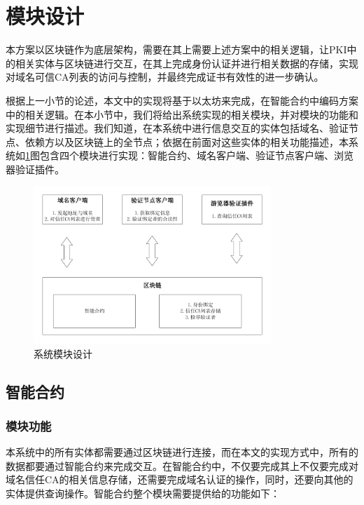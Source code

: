 \section{模块设计}



本方案以区块链作为底层架构，需要在其上需要上述方案中的相关逻辑，让PKI中的相关实体与区块链进行交互，在其上完成身份认证并进行相关数据的存储，实现对域名可信CA列表的访问与控制，并最终完成证书有效性的进一步确认。

根据上一小节的论述，本文中的实现将基于以太坊来完成，在智能合约中编码方案中的相关逻辑。在本小节中，我们将给出系统实现的相关模块，并对模块的功能和实现细节进行描述。我们知道，在本系统中进行信息交互的实体包括域名、验证节点、依赖方以及区块链上的全节点；依据在前面对这些实体的相关功能描述，本系统如\ref{fig:module}图包含四个模块进行实现：智能合约、域名客户端、验证节点客户端、浏览器验证插件。

\begin{figure}[htbp]
 	\centering
 	\includegraphics[width = 0.8\textwidth]{img/module}
 	\caption{系统模块设计}\label{fig:module}
\end{figure}


\subsection{智能合约}

\subsubsection{模块功能}

本系统中的所有实体都需要通过区块链进行连接，而在本文的实现方式中，所有的数据都要通过智能合约来完成交互。在智能合约中，不仅要完成其上不仅要完成对域名信任CA的相关信息存储，还需要完成域名认证的操作，同时，还要向其他的实体提供查询操作。智能合约整个模块需要提供给的功能如下：

